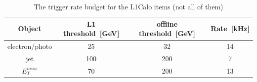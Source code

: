 \begin{table}[h]
	\caption{The trigger rate budget for the L1Calo items (not all of them)}
	\renewcommand{\arraystretch}{1.3}
	\centering
	\begin{tabular}{| c | c | c | c | }
		\hline
		\hline
		Object           &    L1 threshold~[GeV]    &   offline threshold~[GeV] & Rate~[kHz]   \\
		\hline
		electron/photo   &     25                   &   32                      & 14          \\
		\hline
		jet              &     100                 & 200                        &  7        \\
		\hline
		$E^{miss}_{T}$   &     70                  & 200                      &  13                       \\
		\hline
		\hline
	\end{tabular}
	\label{Tab:trig_rate}
\end{table}
